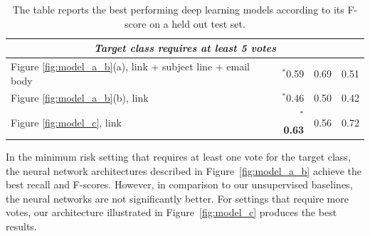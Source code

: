 \documentclass{sigchi}
\begin{document}
\begin{table}[bt]
\begin{tabular}{l r r r}
		\midrule			                             
		\multicolumn{4}{c}{\textit{Target class requires at least 5 votes}}\\
		\midrule		
		Figure \ref{fig:model_a_b}(a), link + subject line + email body & $^*$0.59& 0.69 & 0.51\\ %
		Figure \ref{fig:model_a_b}(b), link & $^*$0.46 & 0.50 & 0.42\\%
		Figure \ref{fig:model_c}, link & $^*$\textbf{0.63} & 0.56  & 0.72\\%
	\end{tabular}
	\caption{The table reports the best performing deep learning models according to its F-score on a held out test set.}
	\label{tab:effectiveness}
\end{table}


In the minimum risk setting that requires at least one vote for the target class, the neural network architectures described in Figure~\ref{fig:model_a_b} achieve the best recall and F-scores. However, in comparison to our unsupervised baselines, the neural networks are not significantly better. For settings that require more votes, our architecture illustrated in Figure~\ref{fig:model_c} produces the best results. 


\end{document}
